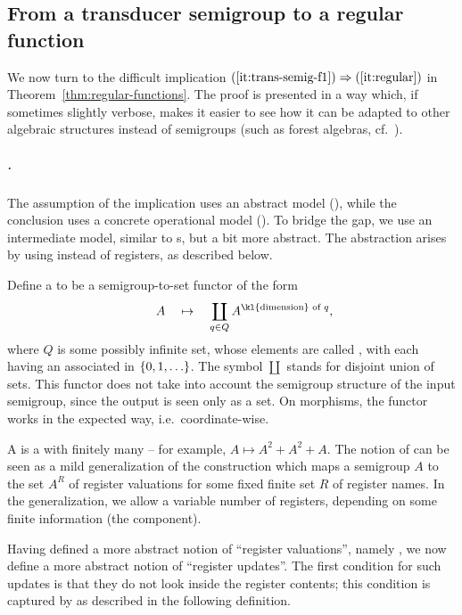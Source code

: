 \subsection{From a transducer semigroup to a regular function}
\label{sec:hard}
We now turn to the difficult implication $(\ref{it:trans-semig-f1}) \Rightarrow (\ref{it:regular})$ in Theorem~\ref{thm:regular-functions}. 
 The proof is presented in a way which, if sometimes slightly verbose, makes it
 easier to see how it can be adapted to other algebraic structures instead of
 semigroups (such as forest algebras, cf.~).

\subparagraph*{.}
\label{sec:abstract-sst} 
The assumption of the implication uses an abstract model (), while the conclusion uses a concrete operational model (). To bridge the gap, we use an intermediate model, similar to \sst{}s, but a bit more abstract. The abstraction arises by using  instead of registers, as described below. 

\AP Define a  to be a semigroup-to-set functor of the form
\begin{align*}
\qquad A \quad \mapsto \quad \coprod_{q \in Q} A^{\text{\kl{dimension} of } q},
\end{align*}
where $Q$ is some possibly infinite set, whose elements are called , with each  having an associated  in $\{0,1,\ldots\}$. The symbol $\coprod$ stands for disjoint union of sets. This functor does not take into account the semigroup structure of the input semigroup, since the output is seen only as a set.
On morphisms, the functor works in the expected way, i.e.~coordinate-wise.  

\AP A  is a  with finitely many  -- for example, $A \mapsto A^2 + A^2 + A$. 
The notion of  can be seen as a mild generalization of the construction which maps a semigroup $A$ to the set $A^R$ of register valuations for some fixed finite set $R$ of register names.  In the generalization, we allow a variable number of registers, depending on some finite information (the component). 

Having defined a more abstract notion of \enquote{register valuations}, namely , we now define a more abstract notion of \enquote{register updates}. The first condition for such updates is that they do not look inside the register contents; this condition is captured by  as described in the following definition. 



